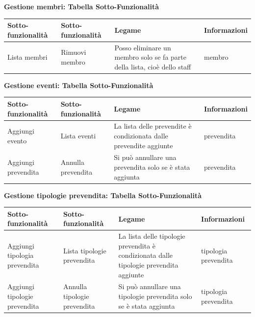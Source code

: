 \documentclass[a4paper]{article}
\begin{document}
\textbf{Gestione membri: Tabella Sotto-Funzionalità}

\begin{center}
    \begin{tabularx}{1\textwidth}{|X|X|X|X|}
    \hline
    \textbf{Sotto-funzionalità} & \textbf{Sotto-funzionalità} & \textbf{Legame} & \textbf{Informazioni}\\
    \hline
    \hline
    Lista membri & Rimuovi membro & Posso eliminare un membro solo se fa parte della lista, cioè dello staff & membro\\
    \hline
    \end{tabularx}
\end{center}

\textbf{Gestione eventi: Tabella Sotto-Funzionalità}

\begin{center}
    \begin{tabularx}{1\textwidth}{|X|X|X|X|}
    \hline
    \textbf{Sotto-funzionalità} & \textbf{Sotto-funzionalità} & \textbf{Legame} & \textbf{Informazioni}\\
    \hline
    \hline
    Aggiungi evento & Lista eventi & La lista delle prevendite è condizionata dalle prevendite aggiunte & prevendita\\
    \hline
    Aggiungi prevendita & Annulla prevendita & Si può annullare una prevendita solo se è stata aggiunta & prevendita\\
    \hline
    \end{tabularx}
\end{center}

\textbf{Gestione tipologie prevendita: Tabella Sotto-Funzionalità}

\begin{center}
    \begin{tabularx}{1\textwidth}{|X|X|X|X|}
    \hline
    \textbf{Sotto-funzionalità} & \textbf{Sotto-funzionalità} & \textbf{Legame} & \textbf{Informazioni}\\
    \hline
    \hline
    Aggiungi tipologia prevendita & Lista tipologie prevendita & La lista delle tipologie prevendita è condizionata dalle tipologie prevendita aggiunte & tipologia prevendita\\
    \hline
    Aggiungi tipologie prevendita & Annulla tipologie prevendita & Si può annullare una tipologie prevendita solo se è stata aggiunta & tipologia prevendita\\
    \hline
    \end{tabularx}
\end{center}
\end{document}
